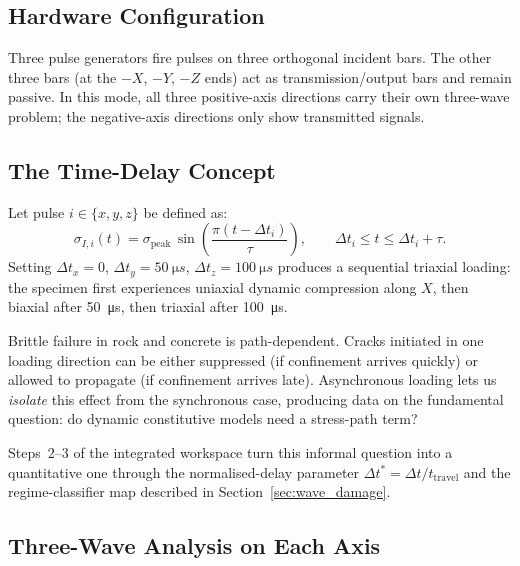 \documentclass[11pt,a4paper]{article}
\providecommand{\SI}[2]{\qty{#1}{#2}}
\newcommand{\sig}{\sigma}
\newcommand{\sigpeak}{\sig_{\text{peak}}}
\begin{document}
\subsection{Hardware Configuration}

Three pulse generators fire pulses on three orthogonal incident bars. The other
three bars (at the $-X$, $-Y$, $-Z$ ends) act as transmission/output bars and
remain passive. In this mode, all three positive-axis directions carry their
own three-wave problem; the negative-axis directions only show transmitted
signals.

\subsection{The Time-Delay Concept}

Let pulse $i \in \{x, y, z\}$ be defined as:
\begin{equation}
  \sig_{I,i}(t) = \sigpeak \, \sin\!\left(\frac{\pi (t - \Delta t_i)}{\tau}\right),
  \qquad \Delta t_i \leq t \leq \Delta t_i + \tau.
  \label{eq:asyncpulse}
\end{equation}
Setting $\Delta t_x = 0$, $\Delta t_y = \SI{50}{\micro s}$,
$\Delta t_z = \SI{100}{\micro s}$ produces a sequential triaxial loading: the
specimen first experiences uniaxial dynamic compression along $X$, then
biaxial after \SI{50}{\micro s}, then triaxial after \SI{100}{\micro s}.

\begin{conceptbox}
Brittle failure in rock and concrete is path-dependent. Cracks initiated in one
loading direction can be either suppressed (if confinement arrives quickly) or
allowed to propagate (if confinement arrives late). Asynchronous loading lets
us \emph{isolate} this effect from the synchronous case, producing data on the
fundamental question: do dynamic constitutive models need a stress-path term?

Steps~2--3 of the integrated workspace turn this informal question into a
quantitative one through the normalised-delay parameter
$\Delta t^\ast = \Delta t / t_{\text{travel}}$ and the regime-classifier map
described in Section~\ref{sec:wave_damage}.
\end{conceptbox}

\subsection{Three-Wave Analysis on Each Axis}
\end{document}
